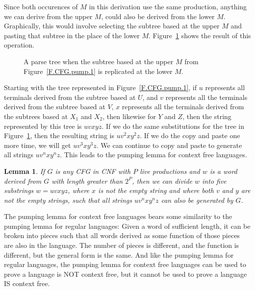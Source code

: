 \documentclass[letterpaper,12pt,openany,reqno]{book}%
\newtheorem{lemma}[theorem]{Lemma}
\begin{document}
Since both occurences of $M$ in this derivation use the same production, anything we can derive from the upper $M$, could also be derived from the lower $M$. Graphically, this would involve selecting the subtree based at the upper $M$ and pasting that subtree in the place of the lower $M$. Figure~\ref{F.CFG.pump.2} shows the result of this operation.
\begin{figure}[htb]
\centering
{}
\caption[CNF Parse Tree]{A parse tree when the subtree based at the upper $M$ from Figure~\ref{F.CFG.pump.1} is replicated at the lower $M$.}
\label{F.CFG.pump.2}
\end{figure}

Starting with the tree represented in Figure~\ref{F.CFG.pump.1}, if $u$ represents all terminals derived from the subtree based at $U$, and $v$ represents all the terminals derived from the subtree based at $V$, $x$ represents all the terminals derived from the subtrees based at $X_1$ and $X_2$, then likewise for $Y$ and $Z$, then the string represented by this tree is $uvxyz$. If we do the same substitutions for the tree in Figure~\ref{F.CFG.pump.2}, then the resulting string is $uv^2xy^2z$. If we do the copy and paste one more time, we will get $uv^3xy^3z$. We can continue to copy and paste to generate all strings $uv^nxy^nz$. This leads to the pumping lemma for context free languages.

\begin{lemma}
\label{T.CFL.pumping.lemma}
If $G$ is any CFG in CNF with $P$ live productions and $w$ is a word derived from $G$ with length greater than $2^P$, then we can divide $w$ into five substrings $w=uvxyz$, where $x$ is not the empty string and where both $v$ and $y$ are not the empty strings, such that all strings $uv^nxy^nz$ can also be generated by $G$.
\end{lemma}

The pumping lemma for context free languages bears some similarity to the pumping lemma for regular languages: Given a word of sufficient length, it can be broken into pieces such that all words derived as some function of those pieces are also in the language. The number of pieces is different, and the function is different, but the general form is the same. And like the pumping lemma for regular languages, the pumping lemma for context free languages can be used to prove a language is NOT context free, but it cannot be used to prove a language IS context free.
\end{document}

